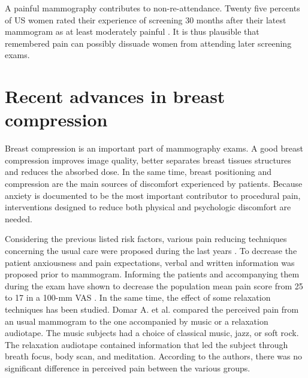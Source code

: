 A painful mammography contributes to non-re-attendance. Twenty five percents of US women rated their experience of screening 30
months after their latest mammogram as at least moderately painful \cite{peipins_impact_2006}. It is thus plausible that remembered pain can possibly dissuade women from
attending later screening exams.

\section{Recent advances in breast compression}\label{section:compressionrecentadvances}

Breast compression is an important part of mammography exams. A good breast compression improves image quality, better separates breast tissues structures and reduces the absorbed dose. In the same time, breast positioning and compression are the main sources of discomfort experienced by patients. Because anxiety is documented to be the most important contributor to procedural pain, interventions designed to reduce both physical and psychologic discomfort are needed.


Considering the previous listed risk factors, various pain reducing techniques concerning the usual care were proposed during the last years \citep{miller_interventions_2008}. To decrease the patient anxiousness and pain expectations, verbal and written information was proposed prior to mammogram. Informing the patients and accompanying them during the exam have shown to decrease the population mean pain score from 25 to 17 in a 100-mm VAS \citep{shrestha_effect_2001}. In the same time, the effect of some relaxation techniques has been studied. Domar A. et al. \cite{ domar_relaxation_2005} compared the perceived pain from an usual mammogram to the one  accompanied by music or a relaxation audiotape. The music subjects had a choice of classical music, jazz, or soft rock.  The relaxation audiotape contained information that led the subject through breath focus, body scan, and meditation. According to the authors, there was no significant difference in perceived pain between the various groups. 

